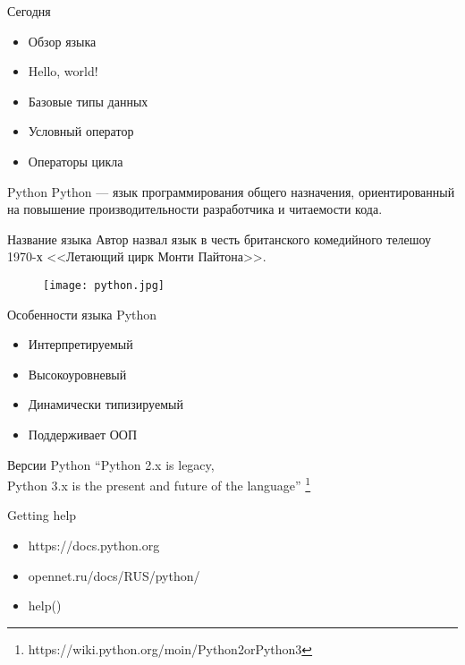 \documentclass[hyperref={pdftex,unicode}]{beamer}
\begin{document}
\begin{frame}{Сегодня}
  \begin{itemize}
  \item Обзор языка
  \item Hello, world!
  \item Базовые типы данных
  \item Условный оператор
  \item Операторы цикла
  \end{itemize}
\end{frame}

\begin{frame}{Python}
  Python --- язык программирования общего назначения,
  ориентированный на повышение производительности разработчика и читаемости кода.
\end{frame}

\begin{frame}{Название языка}
  Автор назвал язык в честь британского комедийного телешоу 1970-х
  <<Летающий цирк Монти Пайтона>>.

  \begin{figure}[H]
    \texttt{[image: python.jpg]}
  \end{figure}
\end{frame}

\begin{frame}{Особенности языка Python}
  \begin{itemize}
    \item Интерпретируемый
    \item Высокоуровневый
    \item Динамически типизируемый
    \item Поддерживает ООП
  \end{itemize}
\end{frame}

\begin{frame}{Версии Python}
  \centering
  ``Python 2.x is legacy, \\
  Python 3.x is the present
  and future of the language'' \footnote[frame]{
    https://wiki.python.org/moin/Python2orPython3}
\end{frame}

\begin{frame}{Getting help}
  \begin{itemize}
    \item https://docs.python.org
    \item opennet.ru/docs/RUS/python/
    \item help()
  \end{itemize}
\end{frame}
\end{document}
